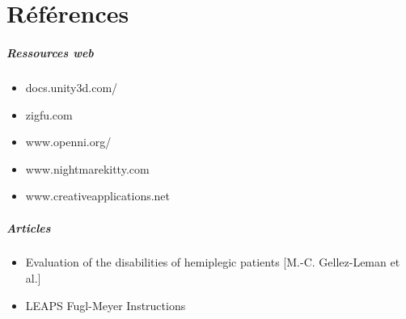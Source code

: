 

\chapter{Références}
\paragraph{Ressources web}
  \begin{itemize}
	\item docs.unity3d.com/
    \item zigfu.com
    \item www.openni.org/
    \item www.nightmarekitty.com 
    \item www.creativeapplications.net
  \end{itemize}
  
\paragraph{Articles}
  \begin {itemize}
    \item Evaluation of the disabilities of hemiplegic patients [M.-C. Gellez-Leman et al.] \label{ref_analyse_litterature}
    \item LEAPS Fugl-Meyer Instructions
  \end{itemize}
        
